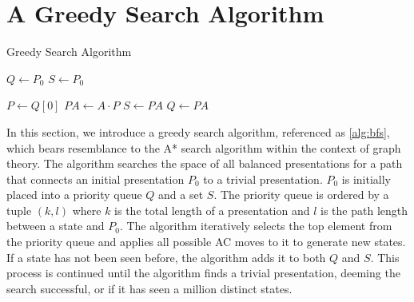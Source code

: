 
\section{A Greedy Search Algorithm}

\begin{algorithm}
	\caption{Greedy Search Algorithm}\label{alg:bfs}
	\begin{algorithmic}
		\State $Q \gets P_0$ 
		\State $S \gets P_0$ 

		 
		\State $P \gets Q[0]$ 
		\State $PA \gets A \cdot P$ 
		\State $S \gets PA$
		\State $Q \gets PA$ 

		\EndIf
		\EndFor
		\EndWhile
	\end{algorithmic}
\end{algorithm}



In this section, we introduce a greedy search algorithm, referenced as \autoref{alg:bfs}, which bears resemblance to the A* search algorithm within the context of graph theory. The algorithm searches the space of all balanced presentations for a path that connects an initial presentation $P_0$ to a trivial presentation.
$P_0$ is initially placed into a priority queue $Q$ and a set $S$. The priority queue is ordered by a tuple $(k, l)$ where $k$ is the total length of a presentation and $l$ is the path length between a state and $P_0$. The algorithm iteratively selects the top element from the priority queue and applies all possible AC moves to it to generate new states. If a state has not been seen before, the algorithm adds it to both $Q$ and $S$. This process is continued until the algorithm finds a trivial presentation, deeming the search successful, or if it has seen a million distinct states. 
\newline

